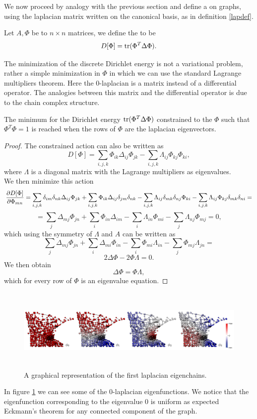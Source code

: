 \documentclass[../2.tex]{subfiles}
\begin{document}
We now proceed by analogy with the previous section and define a  on graphs, using the laplacian matrix written on the canonical basis, as
in definition \ref{lapdef}.

\begin{defn}
    Let $A,\Phi$ be to $n\times n$ matrices, we define the  to be 
    \[ D[\Phi] = \operatorname{tr}(\Phi^T \Delta \Phi). \]
\end{defn}

The minimization of the discrete Dirichlet energy is not a variational problem, rather a simple minimization in $\Phi$ in which we can 
use the standard Lagrange multipliers theorem. Here the $0$-laplacian is a matrix instead of a differential operator. The analogies between
this matrix and the differential operator is due to the chain complex structure.

\begin{prop}
    The minimum for the Dirichlet energy $ \operatorname{tr}(\Phi^T \Delta \Phi)$ constrained to the $\Phi$ such that $\Phi^T \Phi = 1$ is reached when the
    rows of $\Phi$ are the laplacian eigenvectors.
\end{prop}
\begin{proof}
    The constrained action can also be written as
    \[ D[\Phi] = \sum_{i,j,k} \Phi_{ik} \Delta_{ij} \Phi_{jk} - \sum_{i,j,k} \Lambda_{ij} \Phi_{kj} \Phi_{ki}, \]
    where $\Lambda$ is a diagonal matrix with the Lagrange multipliers as eigenvalues.\\ We then minimize this action 
    \[ \frac{\partial D[\Phi]}{\partial \Phi_{mn}} = \sum_{i,j,k} \delta_{im}\delta_{nk}\Delta_{ij} \Phi_{jk} + \sum_{i,j,k} \Phi_{ik} \Delta_{ij}\delta_{jm}\delta_{nk}
    - \sum_{i,j,k} \Lambda_{ij} \delta_{mk}\delta_{nj}\Phi_{ki} - \sum_{i,j,k} \Lambda_{ij} \Phi_{kj} \delta_{mk}\delta_{ni} =  \]
    \[ = \sum_{j} \Delta_{mj} \Phi_{jn} + \sum_{i} \Phi_{in} \Delta_{im} - \sum_{i} \Lambda_{in} \Phi_{mi} - \sum_{j} \Lambda_{nj} \Phi_{mj} = 0, \]
    which using the symmetry of $\Lambda$ and $A$ can be written as
    \[ \sum_{j} \Delta_{mj} \Phi_{jn} + \sum_{i}  \Delta_{mi} \Phi_{in} - \sum_{i} \Phi_{mi}\Lambda_{in} - \sum_{j} \Phi_{mj} \Lambda_{jn} =  \]
    \[ 2\Delta\Phi - 2\Phi\Lambda = 0. \]
    We then obtain 
    \[ \Delta\Phi = \Phi\Lambda, \]
    which for every row of $\Phi$ is an eigenvalue equation. \qedhere
\end{proof}

\begin{figure}[H]
    \centering
    \includegraphics[width=17cm, height=4cm]{sections/2/eiglap}
    \caption{A graphical representation of the first laplacian eigenchains.}
    \label{fig:2:5}
\end{figure}

In figure \ref{fig:2:5} we can see some of the $0$-laplacian eigenfunctions. We notice that the eigenfunction corresponding to the eigenvalue $0$ is uniform as expected 
Eckmann's theorem for any connected component of the graph.

    
\end{document}
